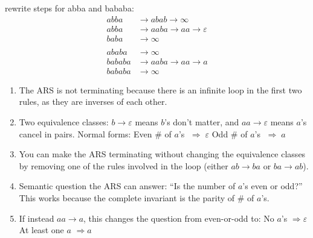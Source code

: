 \documentclass{article}
\begin{document}
rewrite steps for abba and bababa: 
\[
\begin{aligned}
  abba &\to abab \to \infty \\
  abba &\to aaba \to aa \to \varepsilon \\
  baba &\to \infty \\
    \\
  ababa &\to \infty \\
  bababa &\to aaba \to aa \to a \\
  bababa &\to \infty
\end{aligned}
\]

\begin{enumerate}
  \item The ARS is not terminating because there is an infinite loop in the first two rules, as they are inverses of each other.

  \item Two equivalence classes: $b \to \varepsilon$ means $b$’s don’t matter, and $aa \to \varepsilon$ means $a$’s cancel in pairs.  
  Normal forms:  
  Even \# of $a$’s $\;\Rightarrow\; \varepsilon$  
  Odd \# of $a$’s $\;\Rightarrow\; a$

  \item You can make the ARS terminating without changing the equivalence classes by removing one of the rules involved in the loop (either $ab \to ba$ or $ba \to ab$).

  \item Semantic question the ARS can answer: “Is the number of $a$’s even or odd?” This works because the complete invariant is the parity of \# of $a$’s.

  \item If instead $aa \to a$, this changes the question from even-or-odd to:  
  No $a$’s $\Rightarrow \varepsilon$  
  At least one $a$ $\Rightarrow a$
\end{enumerate}
\end{document}
